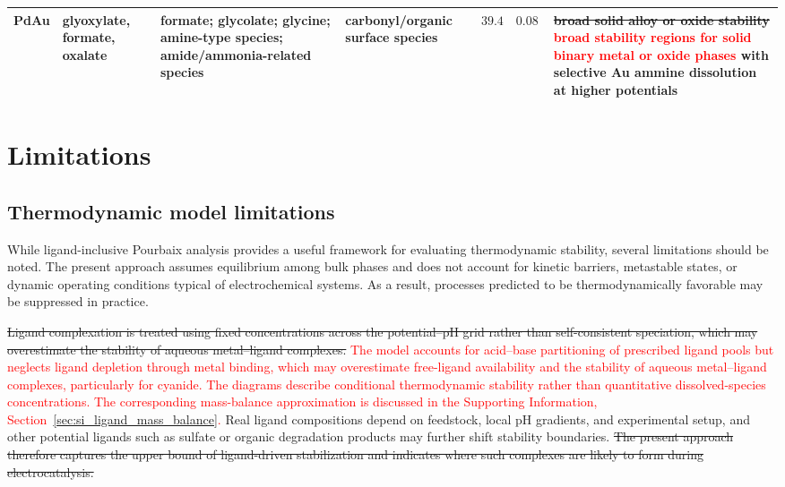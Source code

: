 \documentclass[twoside,twocolumn,9pt]{article}
\begin{document}
\begin{table}[ht]
\begin{tabular}{L{1.1cm} L{2.7cm} L{4.0cm} L{2.8cm} L{1.8cm} L{2.0cm} L{3.2cm}}
PdAu & 
glyoxylate, formate, oxalate & 
formate; glycolate; glycine; amine-type species; amide/ammonia-related species & 
carbonyl/organic surface species & 
{\( 39.4\)} & 
{\( 0.08~\)} & 
\sout{broad solid alloy or oxide stability} \textcolor{red}{broad stability regions for solid binary metal or oxide phases} with selective Au ammine dissolution at higher potentials \\


\bottomrule
\end{tabular}
\end{table}

\section{Limitations}
\subsection{Thermodynamic model limitations}
While ligand-inclusive Pourbaix analysis provides a useful framework for evaluating thermodynamic stability, several limitations should be noted. The present approach assumes equilibrium among bulk phases and does not account for kinetic barriers, metastable states, or dynamic operating conditions typical of electrochemical systems. As a result, processes predicted to be thermodynamically favorable may be suppressed in practice.

\sout{Ligand complexation is treated using fixed concentrations across the potential–pH grid rather than self-consistent speciation, which may overestimate the stability of aqueous metal–ligand complexes.} \textcolor{red}{The model accounts for acid--base partitioning of prescribed ligand pools but neglects ligand depletion through metal binding, which may overestimate free-ligand availability and the stability of aqueous metal--ligand complexes, particularly for cyanide. The diagrams describe conditional thermodynamic stability rather than quantitative dissolved-species concentrations. The corresponding mass-balance approximation is discussed in the Supporting Information, Section~\ref{sec:si_ligand_mass_balance}.} Real ligand compositions depend on feedstock, local pH gradients, and experimental setup, and other potential ligands such as sulfate or organic degradation products may further shift stability boundaries. \sout{The present approach therefore captures the upper bound of ligand-driven stabilization and indicates where such complexes are likely to form during electrocatalysis.}
\end{document}
